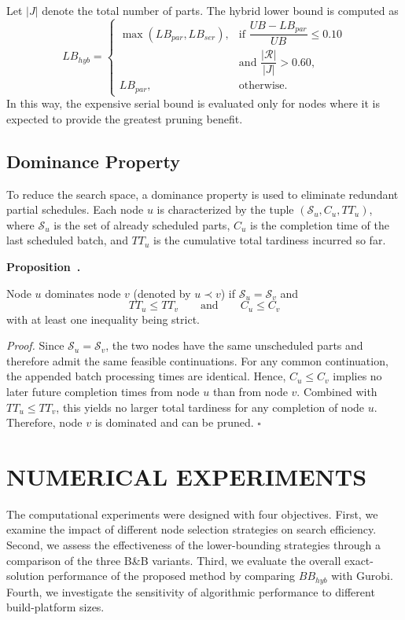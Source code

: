 \documentclass[letterpaper, 10 pt, conference]{ieeeconf}  %
\newcounter{proposition}
\newenvironment{proposition}[1][]{%
  \refstepcounter{proposition}%
  \par\medskip
  \noindent\textbf{Proposition~\arabic{proposition}.} \itshape
}{%
  \par\medskip
}
\begin{document}
Let $|J|$ denote the total number of parts. The hybrid lower bound is computed as
\begin{equation}
    LB_{hyb} =
    \begin{cases}
        \max(LB_{par}, LB_{ser}), & \text{if } \dfrac{UB - LB_{par}}{UB} \le 0.10 \\
                                  & \text{and } \dfrac{|\mathcal{R}|}{|J|} > 0.60, \\[4pt]
        LB_{par}, & \text{otherwise.}
    \end{cases}
\end{equation}
In this way, the expensive serial bound is evaluated only for nodes where it is expected to provide the greatest pruning benefit.

\subsection{Dominance Property}

To reduce the search space, a dominance property is used to eliminate redundant partial schedules. Each node $u$ is characterized by the tuple $(\mathcal{S}_u, C_u, TT_u)$, where $\mathcal{S}_u$ is the set of already scheduled parts, $C_u$ is the completion time of the last scheduled batch, and $TT_u$ is the cumulative total tardiness incurred so far.

\begin{proposition}
Node $u$ dominates node $v$ (denoted by $u \prec v$) if $\mathcal{S}_u = \mathcal{S}_v$ and
\begin{equation}
    TT_u \le TT_v
    \qquad \text{and} \qquad
    C_u \le C_v
\end{equation}
with at least one inequality being strict.
\end{proposition}

\noindent \textit{Proof.}
Since $\mathcal{S}_u = \mathcal{S}_v$, the two nodes have the same unscheduled parts and therefore admit the same feasible continuations. For any common continuation, the appended batch processing times are identical. Hence, $C_u \le C_v$ implies no later future completion times from node $u$ than from node $v$. Combined with $TT_u \le TT_v$, this yields no larger total tardiness for any completion of node $u$. Therefore, node $v$ is dominated and can be pruned.
\hfill$\square$

\section{NUMERICAL EXPERIMENTS}
The computational experiments were designed with four objectives. First, we examine the impact of different node selection strategies on search efficiency. Second, we assess the effectiveness of the lower-bounding strategies through a comparison of the three B\&B variants. Third, we evaluate the overall exact-solution performance of the proposed method by comparing $BB_{hyb}$ with Gurobi. Fourth, we investigate the sensitivity of algorithmic performance to different build-platform sizes.
\end{document}
